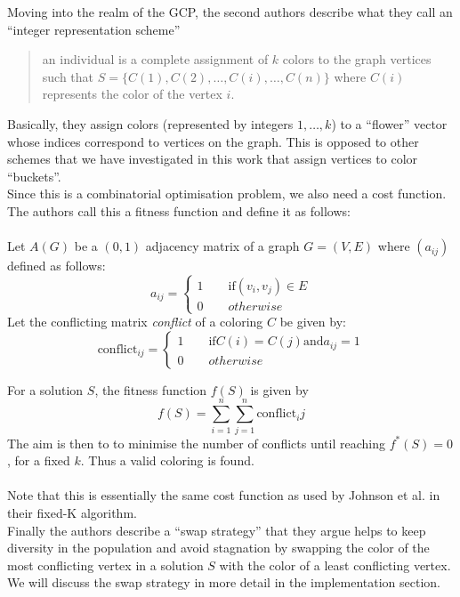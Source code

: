 Moving into the realm of the GCP, the second authors describe what they call an ``integer representation scheme''
\begin{quotation}
an individual is a complete assignment of $k$ colors to the graph vertices such that $S = \{ C(1),C(2),\ldots,C(i),\ldots,C(n) \}$ where $C(i)$ represents the color of the vertex $i$.
\end{quotation}
Basically, they assign colors (represented by integers $1,\ldots,k$) to a ``flower'' vector whose indices correspond to vertices on the graph. This is opposed to other schemes that we have investigated in this work that assign vertices to color ``buckets''.\\
Since this is a combinatorial optimisation problem, we also need a cost function. The authors call this a fitness function and define it as follows:\\~\\
Let $A(G)$ be a $(0,1)$ adjacency matrix of a graph $G = (V,E)$ where $(a_{ij})$ defined as follows:
\begin{equation}
a_{ij} = \begin{cases}
1 \qquad \text{if} (v_i,v_j) \in E\\
0 \qquad otherwise
\end{cases}
\end{equation}
Let the conflicting matrix \emph{conflict} of a coloring $C$ be given by:
\begin{equation}
\text{conflict}_{ij} = \begin{cases}
1 \qquad \text{if} C(i)=C(j) \text{and} a_{ij}=1\\
0 \qquad otherwise
\end{cases}
\end{equation}

For a solution $S$, the fitness function $f(S)$ is given by
\begin{equation}
f(S) = \displaystyle \sum_{i=1}^{n} \sum_{j=1}^{n} \text{conflict}_ij
\end{equation}
The aim is then to to minimise the number of conflicts until reaching $f^*(S) = 0$, for a fixed $k$. Thus a valid coloring is found.\\~\\

Note that this is essentially the same cost function as used by Johnson et al. in their fixed-K algorithm.\\
Finally the authors describe a ``swap strategy'' that they argue helps to keep diversity in the population and avoid stagnation by swapping the color of the most conflicting vertex in a solution $S$ with the color of a least conflicting vertex. We will discuss the swap strategy in more detail in the implementation section.\\

